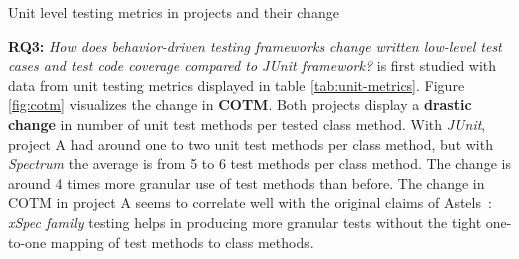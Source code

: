 {\renewcommand{\arraystretch}{1.3}
\begin{table}[H]
        \caption {Unit level testing metrics in projects and their change} \label{tab:unit-metrics}
        \caption*{* = Value in parenthesis is without calculating data-driven tests sum}
\end{table}
}

\textbf{RQ3: }\textit{How does behavior-driven testing frameworks change written low-level test cases and test code coverage compared to \textit{JUnit} framework?}
is first studied with data from unit testing metrics displayed in table \ref{tab:unit-metrics}. Figure \ref{fig:cotm} visualizes
the change in \textbf{COTM}. Both projects display a \textbf{drastic change} in number of unit test methods per tested class method. With \textit{JUnit}, project A
had around one to two unit test methods per class method, but with \textit{Spectrum} the average is from 5 to 6 test methods per class method. The
change is around 4 times more granular use of test methods than before. The change in COTM in project A seems to correlate well with the original
claims of Astels~\cite{astels2006new}: \textit{xSpec family} testing helps in producing more granular tests without the tight one-to-one mapping of test methods
to class methods.


